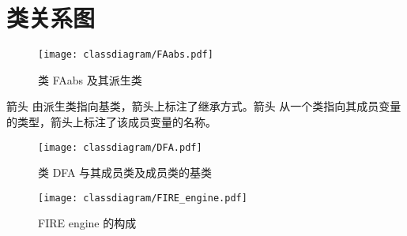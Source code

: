 \chapter{类关系图}

\begin{figure}[!htbp]
    \centering
        \texttt{[image: classdiagram/FAabs.pdf]}
    \caption{类 FAabs 及其派生类}
    \label{fig:class-faabs}
\end{figure}

箭头 {} 由派生类指向基类，箭头上标注了继承方式。箭头 {} 从一个类指向其成员变量的类型，箭头上标注了该成员变量的名称。







\begin{figure}[!htbp]
    \centering
        \texttt{[image: classdiagram/DFA.pdf]}
    \caption{类 DFA 与其成员类及成员类的基类}
    \label{fig:class-dfa}
\end{figure}

\begin{figure}[!htbp]
    \centering
        \texttt{[image: classdiagram/FIRE\_engine.pdf]}
    \caption{FIRE engine 的构成}
    \label{fig:FIRE-engine}
\end{figure}